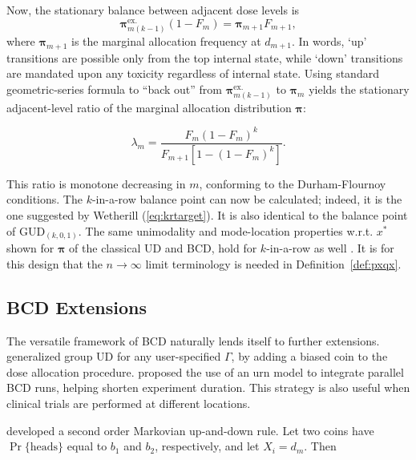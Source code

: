 Now, the stationary balance between adjacent dose levels is
\begin{equation}\label{eq:kexternal}
\boldsymbol{\pi}^{\textrm{ex.}}_{m(k-1)}\left(1-F_m\right)=\boldsymbol{\pi}_{m+1}F_{m+1},
\end{equation}
\noindent where $\boldsymbol{\pi}_{m+1}$ is the marginal allocation frequency at $d_{m+1}$. In words, `up' transitions are possible only from the top internal state, while `down' transitions are mandated upon any toxicity regardless of internal state. Using standard geometric-series formula to ``back out'' from $\boldsymbol{\pi}^{\textrm{ex.}}_{m(k-1)}$ to $\boldsymbol{\pi}_m$ yields the stationary adjacent-level ratio of the marginal allocation distribution $\boldsymbol{\pi}$:

\begin{equation}\label{eq:krgamma}
\lambda_m=\frac{F_m\left(1-F_m\right)^{k}}{F_{m+1}\left[1-\left(1-F_m\right)^{k}\right]}.
\end{equation}

This ratio is monotone decreasing in $m$, conforming to the Durham-Flournoy conditions. The $k$-in-a-row balance point can now be calculated; indeed, it is the one suggested by Wetherill (\ref{eq:krtarget}). It is also identical to the balance point of GUD$_{(k,0,1)}$. The same unimodality and mode-location properties w.r.t. $x^*$ shown for $\boldsymbol{\pi}$ of the classical UD and BCD, hold for $k$-in-a-row as well \citep{Oron:Hoff:thek:2009}. It is for this design that the $n\to\infty$ limit terminology is needed in Definition~\ref{def:pxqx}.

\subsection{BCD Extensions}

The versatile framework of BCD naturally lends itself to further extensions. \cite{Bald:Bort:Giov:2008} generalized group UD for any user-specified $\Gamma$, by adding a biased coin to the dose allocation procedure. \cite{Flou:aran:1998} proposed the use of an urn model to integrate parallel BCD runs, helping shorten experiment duration. This strategy is also useful when clinical trials are performed at different locations.

\citep{Bort:Giov:Upan:2005} developed a second order Markovian up-and-down rule. Let two coins have $\Pr\{\textrm{heads}\}$ equal to $b_1$ and $b_2$, respectively, and let $X_i=d_m$. Then

